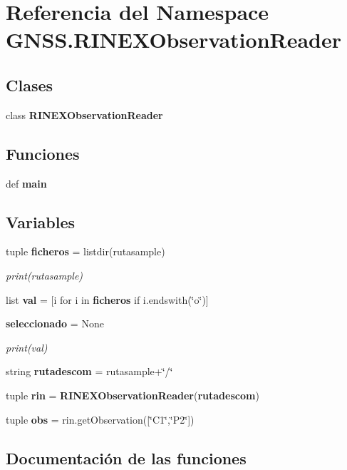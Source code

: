 \section{Referencia del Namespace G\-N\-S\-S.\-R\-I\-N\-E\-X\-Observation\-Reader}
\label{namespaceGNSS_1_1RINEXObservationReader}
\subsection*{Clases}
\begin{DoxyCompactItemize}
\item 
class {\bf R\-I\-N\-E\-X\-Observation\-Reader}
\end{DoxyCompactItemize}
\subsection*{Funciones}
\begin{DoxyCompactItemize}
\item 
def {\bf main}
\end{DoxyCompactItemize}
\subsection*{Variables}
\begin{DoxyCompactItemize}
\item 
tuple {\bf ficheros} = listdir(rutasample)
\begin{DoxyCompactList}\small\item\em print(rutasample) \end{DoxyCompactList}\item 
list {\bf val} = [i for i in {\bf ficheros} if i.\-endswith(\char`\"{}o\char`\"{})]
\item 
{\bf seleccionado} = None
\begin{DoxyCompactList}\small\item\em print(val) \end{DoxyCompactList}\item 
string {\bf rutadescom} = rutasample+\char`\"{}/\char`\"{}
\item 
tuple {\bf rin} = {\bf R\-I\-N\-E\-X\-Observation\-Reader}({\bf rutadescom})
\item 
tuple {\bf obs} = rin.\-get\-Observation([\char`\"{}C1\char`\"{},\char`\"{}P2\char`\"{}])
\end{DoxyCompactItemize}


\subsection{Documentación de las funciones}

